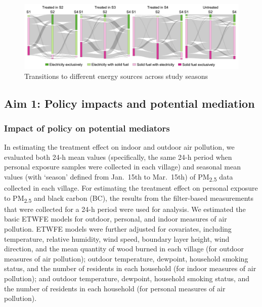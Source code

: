 \documentclass[
  letterpaper,
  DIV=11,
  numbers=noendperiod]{scrartcl}
\begin{document}
\begin{figure}[H]

{\centering \includegraphics[width=1\textwidth,height=\textheight]{images/Sankey diagram_2.png}

}

\caption{\label{fig-sankey}Transitions to different energy sources
across study seasons}

\end{figure}

\hypertarget{aim-1-policy-impacts-and-potential-mediation}{%
\subsection{Aim 1: Policy impacts and potential
mediation}\label{aim-1-policy-impacts-and-potential-mediation}}

\hypertarget{impact-of-policy-on-potential-mediators}{%
\subsubsection{Impact of policy on potential
mediators}\label{impact-of-policy-on-potential-mediators}}

In estimating the treatment effect on indoor and outdoor air pollution,
we evaluated both 24-h mean values (specifically, the same 24-h period
when personal exposure samples were collected in each village) and
seasonal mean values (with `season' defined from Jan.~15th to Mar.~15th)
of PM\textsubscript{2.5} data collected in each village. For estimating
the treatment effect on personal exposure to PM\textsubscript{2.5} and
black carbon (BC), the results from the filter-based measurements that
were collected for a 24-h period were used for analysis. We estimated
the basic ETWFE models for outdoor, personal, and indoor measures of air
pollution. ETWFE models were further adjusted for covariates, including
temperature, relative humidity, wind speed, boundary layer height, wind
direction, and the mean quantity of wood burned in each village (for
outdoor measures of air pollution); outdoor temperature, dewpoint,
household smoking status, and the number of residents in each household
(for indoor measures of air pollution); and outdoor temperature,
dewpoint, household smoking status, and the number of residents in each
household (for personal measures of air pollution).
\end{document}
